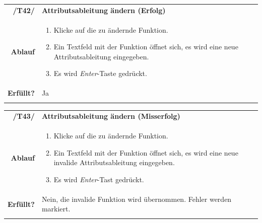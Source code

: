 \documentclass{article}
\begin{document}
\begin{table}[H]
\begin{tabularx}{\textwidth}{rX}
\vspace{1mm}
\textbf{/T42/}         & \textbf{Attributsableitung ändern (Erfolg)} \\ \vspace{1mm}
\textbf{Ablauf} & 
\begin{enumerate}
        \item Klicke auf die zu ändernde Funktion.
        \item Ein Textfeld mit der Funktion öffnet sich, es wird eine neue Attributsableitung eingegeben.
        \item Es wird \textit{Enter}-Taste gedrückt.
    \end{enumerate} \\ \vspace{1mm}
\textbf{Erfüllt?}  & Ja  \\ \vspace{1mm}
\end{tabularx}
\end{table}

\begin{table}[H]
\begin{tabularx}{\textwidth}{rX}
\vspace{1mm}
\textbf{/T43/}         & \textbf{Attributsableitung ändern (Misserfolg)} \\ \vspace{1mm}
\textbf{Ablauf} & 
\begin{enumerate}
        \item Klicke auf die zu ändernde Funktion.
        \item Ein Textfeld mit der Funktion öffnet sich, es wird eine neue invalide Attributsableitung eingegeben.
        \item Es wird \textit{Enter}-Tast gedrückt.
    \end{enumerate} \\ \vspace{1mm}
\textbf{Erfüllt?}  & Nein, die invalide Funktion wird übernommen. Fehler werden markiert.  \\ \vspace{1mm}
\end{tabularx}
\end{table}
\end{document}
